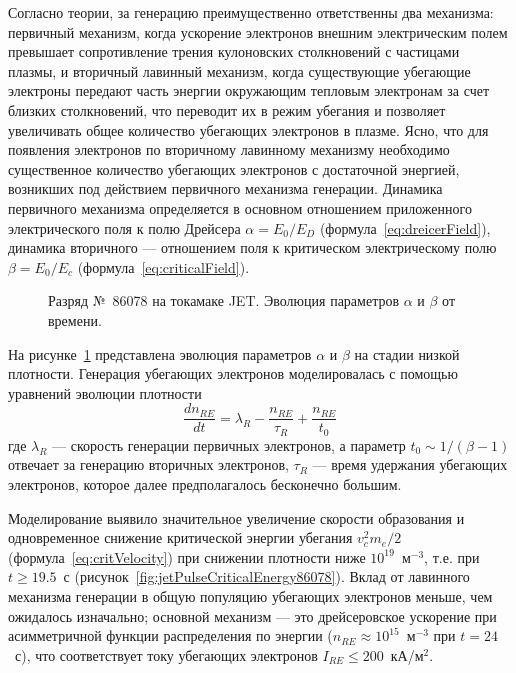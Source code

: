 Согласно теории, за генерацию преимущественно ответственны два механизма: первичный механизм, когда ускорение электронов внешним электрическим полем превышает сопротивление трения кулоновских столкновений с частицами плазмы, и вторичный лавинный механизм, когда существующие убегающие электроны передают часть энергии окружающим тепловым электронам за счет близких столкновений, что переводит их в режим убегания и позволяет увеличивать общее количество убегающих электронов в плазме. Ясно, что для появления электронов по вторичному лавинному механизму необходимо существенное количество убегающих электронов с достаточной энергией, возникших под действием первичного механизма генерации. Динамика первичного механизма определяется в основном отношением приложенного электрического поля к полю Дрейсера $\alpha = E_0/E_{D}$ (формула~\ref{eq:dreicerField}), динамика вторичного --- отношением поля к критическом электрическому полю $\beta = E_0 / E_c $ (формула~\ref{eq:criticalField}).~\cite{Plyusnin2015}

\begin{figure}[ht!]
  \caption{ Разряд №~86078 на токамаке JET. Эволюция параметров $\alpha$ и $\beta$ от времени.~\cite{Plyusnin2015} }
  \label{fig:jetPulseAlphaBeta86078}
\end{figure}

На рисунке~\ref{fig:jetPulseAlphaBeta86078} представлена эволюция параметров $\alpha$ и $\beta$ на стадии низкой плотности. Генерация убегающих электронов моделировалась с помощью уравнений эволюции плотности
\begin{equation*}
  \frac{ d n_{RE} }{ d t } = \lambda_R - \frac{ n_{RE} }{ \tau_R } + \frac{ n_{RE} }{ t_0 }
\end{equation*}
где $\lambda_R$ --- скорость генерации первичных электронов, а параметр $t_0 \sim 1/(\beta - 1 )$ отвечает за генерацию вторичных электронов, $\tau_R$ --- время удержания убегающих электронов, которое далее предполагалось бесконечно большим.~\cite{Plyusnin2015}

Моделирование выявило значительное увеличение скорости образования и одновременное снижение критической энергии убегания $v_c^2 m_e /2$ (формула~\ref{eq:critVelocity}) при снижении плотности ниже $10^{19}$~м${}^{-3}$, т.е. при $t \ge 19.5$~с (рисунок~\ref{fig:jetPulseCriticalEnergy86078}). Вклад от лавинного механизма генерации в общую популяцию убегающих электронов меньше, чем ожидалось изначально; основной механизм --- это дрейсеровское ускорение при асимметричной функции распределения по энергии ($n_{RE} \approx 10^{15}$~м${}^{-3}$ при $t = 24$~с), что соответствует току убегающих электронов $I_{RE} \le 200$~кА/м${}^2$. 


